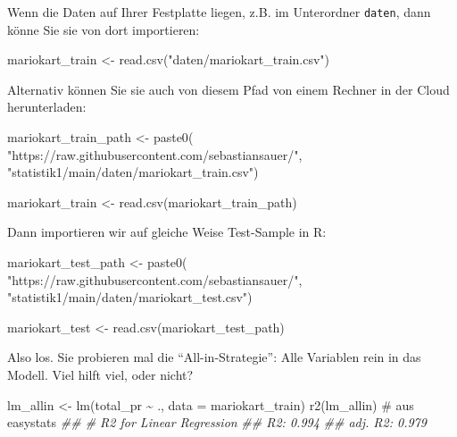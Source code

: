 \documentclass[
  a4paper,
]{scrbook}
\newenvironment{Shaded}{\begin{snugshade}}{\end{snugshade}}
\newcommand{\AttributeTok}[1]{\textcolor[rgb]{0.40,0.45,0.13}{#1}}
\newcommand{\CommentTok}[1]{\textcolor[rgb]{0.37,0.37,0.37}{#1}}
\newcommand{\DocumentationTok}[1]{\textcolor[rgb]{0.37,0.37,0.37}{\textit{#1}}}
\newcommand{\FunctionTok}[1]{\textcolor[rgb]{0.28,0.35,0.67}{#1}}
\newcommand{\NormalTok}[1]{\textcolor[rgb]{0.00,0.23,0.31}{#1}}
\newcommand{\OtherTok}[1]{\textcolor[rgb]{0.00,0.23,0.31}{#1}}
\newcommand{\SpecialCharTok}[1]{\textcolor[rgb]{0.37,0.37,0.37}{#1}}
\newcommand{\StringTok}[1]{\textcolor[rgb]{0.13,0.47,0.30}{#1}}
\theoremstyle{definition}
\theoremstyle{definition}
\theoremstyle{definition}
\theoremstyle{remark}
\begin{document}
Wenn die Daten auf Ihrer Festplatte liegen, z.B. im Unterordner
\texttt{daten}, dann könne Sie sie von dort importieren:

\begin{Shaded}
\begin{Highlighting}[]
\NormalTok{mariokart\_train }\OtherTok{\textless{}{-}} \FunctionTok{read.csv}\NormalTok{(}\StringTok{"daten/mariokart\_train.csv"}\NormalTok{)}
\end{Highlighting}
\end{Shaded}

Alternativ können Sie sie auch von diesem Pfad von einem Rechner in der
Cloud herunterladen:

\begin{Shaded}
\begin{Highlighting}[]
\NormalTok{mariokart\_train\_path }\OtherTok{\textless{}{-}} \FunctionTok{paste0}\NormalTok{( }\StringTok{"https://raw.githubusercontent.com/sebastiansauer/"}\NormalTok{,}
\StringTok{"statistik1/main/daten/mariokart\_train.csv"}\NormalTok{)}

\NormalTok{mariokart\_train }\OtherTok{\textless{}{-}} \FunctionTok{read.csv}\NormalTok{(mariokart\_train\_path)}
\end{Highlighting}
\end{Shaded}

Dann importieren wir auf gleiche Weise Test-Sample in R:

\begin{Shaded}
\begin{Highlighting}[]
\NormalTok{mariokart\_test\_path }\OtherTok{\textless{}{-}} \FunctionTok{paste0}\NormalTok{(}
 \StringTok{"https://raw.githubusercontent.com/sebastiansauer/"}\NormalTok{,}
 \StringTok{"statistik1/main/daten/mariokart\_test.csv"}\NormalTok{)}

\NormalTok{mariokart\_test }\OtherTok{\textless{}{-}} \FunctionTok{read.csv}\NormalTok{(mariokart\_test\_path)}
\end{Highlighting}
\end{Shaded}

Also los. Sie probieren mal die ``All-in-Strategie'': Alle Variablen
rein in das Modell. Viel hilft viel, oder nicht?

\begin{Shaded}
\begin{Highlighting}[]
\NormalTok{lm\_allin }\OtherTok{\textless{}{-}} \FunctionTok{lm}\NormalTok{(total\_pr }\SpecialCharTok{\textasciitilde{}}\NormalTok{ ., }\AttributeTok{data =}\NormalTok{ mariokart\_train)}
\FunctionTok{r2}\NormalTok{(lm\_allin)  }\CommentTok{\# aus easystats}
\DocumentationTok{\#\# \# R2 for Linear Regression}
\DocumentationTok{\#\#        R2: 0.994}
\DocumentationTok{\#\#   adj. R2: 0.979}
\end{Highlighting}
\end{Shaded}
\end{document}
